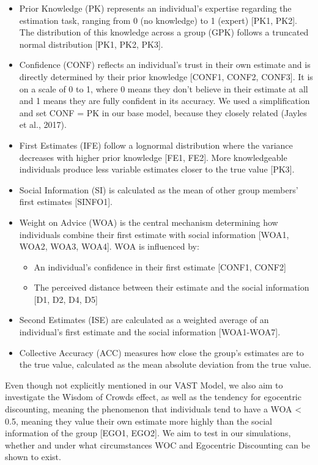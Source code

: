 \documentclass[
  man,floatsintext]{apa6}
\providecommand{\tightlist}{%
  \setlength{\itemsep}{0pt}\setlength{\parskip}{0pt}}
\begin{document}
\begin{itemize}
\item
  Prior Knowledge (PK) represents an individual's expertise regarding the estimation task, ranging from 0 (no knowledge) to 1 (expert) {[}PK1, PK2{]}. The distribution of this knowledge across a group (GPK) follows a truncated normal distribution {[}PK1, PK2, PK3{]}.
\item
  Confidence (CONF) reflects an individual's trust in their own estimate and is directly determined by their prior knowledge {[}CONF1, CONF2, CONF3{]}. It is on a scale of 0 to 1, where 0 means they don't believe in their estimate at all and 1 means they are fully confident in its accuracy. We used a simplification and set CONF = PK in our base model, because they closely related (Jayles et al., 2017).
\item
  First Estimates (IFE) follow a lognormal distribution where the variance decreases with higher prior knowledge {[}FE1, FE2{]}. More knowledgeable individuals produce less variable estimates closer to the true value {[}PK3{]}.
\item
  Social Information (SI) is calculated as the mean of other group members' first estimates {[}SINFO1{]}.
\item
  Weight on Advice (WOA) is the central mechanism determining how individuals combine their first estimate with social information {[}WOA1, WOA2, WOA3, WOA4{]}. WOA is influenced by:

  \begin{itemize}
  \tightlist
  \item
    An individual's confidence in their first estimate {[}CONF1, CONF2{]}
  \item
    The perceived distance between their estimate and the social information {[}D1, D2, D4, D5{]}
  \end{itemize}
\item
  Second Estimates (ISE) are calculated as a weighted average of an individual's first estimate and the social information {[}WOA1-WOA7{]}.
\item
  Collective Accuracy (ACC) measures how close the group's estimates are to the true value, calculated as the mean absolute deviation from the true value.
\end{itemize}

Even though not explicitly mentioned in our VAST Model, we also aim to investigate the Wisdom of Crowds effect, as well as the tendency for egocentric discounting, meaning the phenomenon that individuals tend to have a WOA \textless{} 0.5, meaning they value their own estimate more highly than the social information of the group {[}EGO1, EGO2{]}. We aim to test in our simulations, whether and under what circumstances WOC and Egocentric Discounting can be shown to exist.
\end{document}
